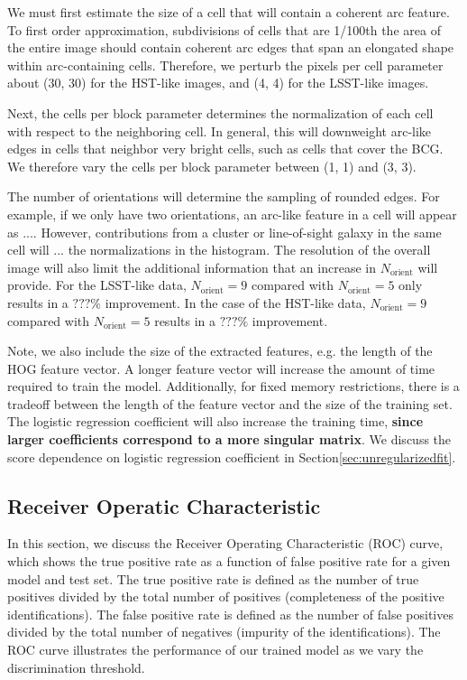 \documentclass{emulateapj}
\newcommand{\todo}[1]{{\bf\color{blue} #1}}
\begin{document}
We must first estimate the size of a cell that will contain a coherent
arc feature.  To first order approximation, subdivisions of cells that
are 1/100th the area of the entire image should contain coherent arc
edges that span an elongated shape within arc-containing cells.
Therefore, we perturb the pixels per cell parameter about (30, 30) for
the HST-like images, and (4, 4) for the LSST-like images.

Next, the cells per block parameter determines the normalization of
each cell with respect to the neighboring cell.  In general, this will
downweight arc-like edges in cells that neighbor very bright cells,
such as cells that cover the BCG.  We therefore vary the cells per
block parameter between (1, 1) and (3, 3).

The number of orientations will determine the sampling of rounded
edges.  For example, if we only have two orientations, an arc-like
feature in a cell will appear as .... However, contributions from a
cluster or line-of-sight galaxy in the same cell will ... the
normalizations in the histogram.  The resolution of the overall image
will also limit the additional information that an increase in
$N_\text{orient}$ will provide.  For the LSST-like data,
$N_\text{orient}=9$ compared with $N_\text{orient}=5$ only
results in a $???\%$ improvement.  In the case of the HST-like data,
$N_\text{orient}=9$ compared with $N_\text{orient}=5$
results in a $???\%$ improvement.

Note, we also include the size of the extracted features, e.g. the
length of the HOG feature vector.  A longer feature vector will
increase the amount of time required to train the model.
Additionally, for fixed memory restrictions, there is a tradeoff
between the length of the feature vector and the size of the training
set.  The logistic regression coefficient will also increase the
training time, \todo{since larger coefficients correspond to a more
  singular matrix}.  We discuss the score dependence on logistic
regression coefficient in Section\ref{sec:unregularizedfit}.

\subsection{Receiver Operatic Characteristic}

In this section, we discuss the Receiver Operating Characteristic
(ROC) curve, which shows the true positive rate as a function of false
positive rate for a given model and test set.  The true positive rate
is defined as the number of true positives divided by the total number
of positives (completeness of the positive identifications).  The
false positive rate is defined as the number of false positives
divided by the total number of negatives (impurity of the
identifications).  The ROC curve illustrates the performance of our
trained model as we vary the discrimination threshold.
\end{document}
